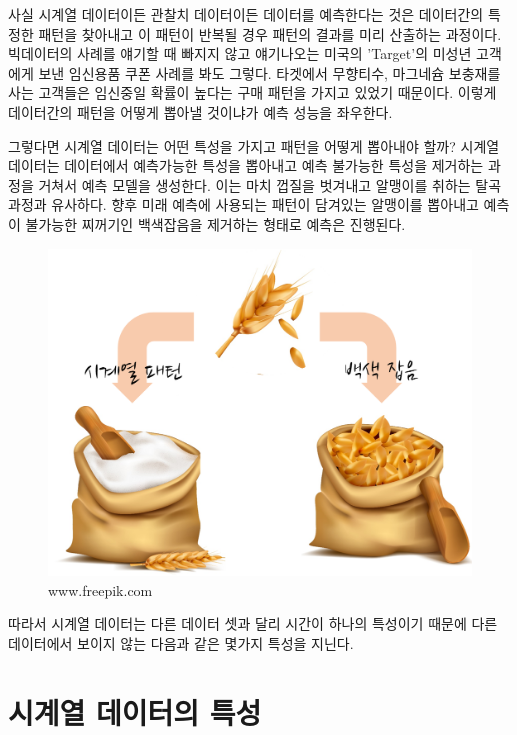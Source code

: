 \documentclass[
]{book}
\begin{document}
사실 시계열 데이터이든 관찰치 데이터이든 데이터를 예측한다는 것은 데이터간의 특정한 패턴을 찾아내고 이 패턴이 반복될 경우 패턴의 결과를 미리 산출하는 과정이다. 빅데이터의 사례를 얘기할 때 빠지지 않고 얘기나오는 미국의 'Target'의 미성년 고객에게 보낸 임신용품 쿠폰 사례를 봐도 그렇다. 타겟에서 무향티수, 마그네슘 보충재를 사는 고객들은 임신중일 확률이 높다는 구매 패턴을 가지고 있었기 때문이다. 이렇게 데이터간의 패턴을 어떻게 뽑아낼 것이냐가 예측 성능을 좌우한다.

그렇다면 시계열 데이터는 어떤 특성을 가지고 패턴을 어떻게 뽑아내야 할까? 시계열 데이터는 데이터에서 예측가능한 특성을 뽑아내고 예측 불가능한 특성을 제거하는 과정을 거쳐서 예측 모델을 생성한다. 이는 마치 껍질을 벗겨내고 알맹이를 취하는 탈곡과정과 유사하다. 향후 미래 예측에 사용되는 패턴이 담겨있는 알맹이를 뽑아내고 예측이 불가능한 찌꺼기인 백색잡음을 제거하는 형태로 예측은 진행된다.

\begin{figure}
\centering
\includegraphics{forecast.png}
\caption{www.freepik.com}
\end{figure}

따라서 시계열 데이터는 다른 데이터 셋과 달리 시간이 하나의 특성이기 때문에 다른 데이터에서 보이지 않는 다음과 같은 몇가지 특성을 지닌다.

\hypertarget{uxc2dcuxacc4uxc5f4-uxb370uxc774uxd130uxc758-uxd2b9uxc131}{%
\section{시계열 데이터의 특성}\label{uxc2dcuxacc4uxc5f4-uxb370uxc774uxd130uxc758-uxd2b9uxc131}}
\end{document}
